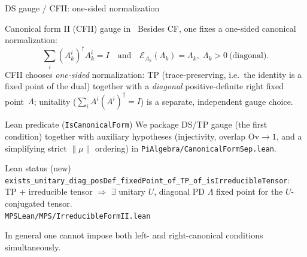 \documentclass[aspectratio=169,10pt]{beamer}
\newcommand{\cE}{\mathcal{E}}
\newcommand{\Ov}{\mathrm{Ov}}
\begin{document}
\begin{frame}{DS gauge / CFII: one-sided normalization}
    \vspace{-0.6em}

    \begin{block}{Canonical form II (CFII) gauge in~\cite{Cirac2017Annals}}
        Besides CF, one fixes a one-sided canonical normalization:
        \[
            \sum_i (A_k^i)^\dagger A_k^i = I
            \quad\text{and}\quad
            \cE_{A_k}(\Lambda_k)=\Lambda_k,\;\Lambda_k>0\ \text{(diagonal)}.
        \]
        CFII chooses \emph{one-sided} normalization: TP (trace-preserving, i.e.\ the identity is a fixed point of the dual) together with a \emph{diagonal} positive-definite right fixed point~$\Lambda$; unitality ($\sum_i A^i(A^i)^\dagger = I$) is a separate, independent gauge choice.
    \end{block}

    \begin{block}{Lean predicate (\texttt{IsCanonicalForm})}
        We package DS/TP gauge (the first condition) together with auxiliary hypotheses
        (injectivity, overlap $\Ov\to 1$, and a simplifying strict $\|\mu\|$ ordering) in
        \texttt{PiAlgebra/CanonicalFormSep.lean}.
    \end{block}

    \begin{block}{Lean status \textnormal{\scriptsize(new)}}
        {\scriptsize
        \textcolor{leangreen}{\checkmark}~%
        \texttt{exists\_unitary\_diag\_posDef\_fixedPoint\_of\_TP\_of\_isIrreducibleTensor}:\\
        \quad TP + irreducible tensor $\Rightarrow$ $\exists$ unitary $U$, diagonal PD $\Lambda$
        fixed point for the $U$-conjugated tensor.\\
        {\textcolor{dimwhite}{\texttt{MPSLean/MPS/IrreducibleFormII.lean}}}~\cite{Cirac2017Annals,Cirac2017Irreducible}}
    \end{block}

    \textcolor{dimwhite}{\footnotesize In general one cannot impose both left- and right-canonical conditions simultaneously.}
\end{frame}

\end{document}
